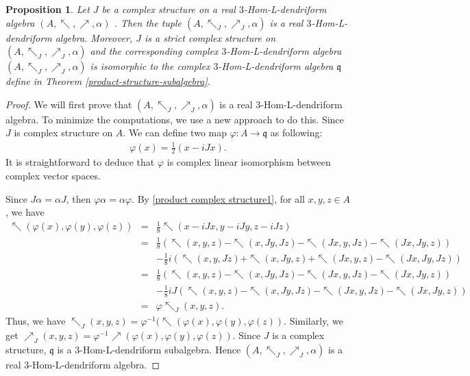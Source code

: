 \documentclass[a4paper,11pt]{article}
\def\a{\alpha}
\def\g{\gamma}
\def\nw{\nwarrow}
\def\ne{\nearrow}
\newtheorem{pro}[thm]{Proposition}
\theoremstyle{definition}
\begin{document}
\begin{pro}\label{subalgebra-iso}
Let $J$ be a complex structure on a real $3$-Hom-L-dendriform algebra $(A,\nw,\ne,\alpha)$ . Then the tuple $(A,\nw_J,\ne_J,\alpha)$ is a real $3$-Hom-L-dendriform algebra. Moreover, $J$ is a strict complex structure on  $(A,\nw_J,\ne_J,\alpha)$ and the corresponding complex $3$-Hom-L-dendriform algebra $(A,\nw_J,\ne_J,\alpha)$  is isomorphic to the complex $3$-Hom-L-dendriform algebra $\mathfrak{q}$ define in Theorem \ref{product-structure-subalgebra}.
\end{pro}
\begin{proof}
We will first prove that   $(A,\nw_J,\ne_J,\alpha)$ is a real $3$-Hom-L-dendriform algebra. To minimize the computations, we use a new approach to do this.
Since $J$ is  complex structure on $A$. We can define  two map $\varphi:A\to\mathfrak{q}$  as following:
\begin{eqnarray*}
\varphi(x)=\frac{1}{2}(x-iJx).
\end{eqnarray*}
It is straightforward to deduce that $\varphi$ is complex linear isomorphism between complex vector spaces.
%

  Since $J\a=\a J $, then $\varphi\a=\a \varphi $. By \eqref{product complex structure1}, for all $x,y,z\in A$, we have
\begin{eqnarray}
\nonumber\nw(\varphi(x),\varphi(y),\varphi(z))&=&\frac{1}{8}\nw(x-iJx,y-iJy,z-iJz)\\
                                                  \nonumber &=&\frac{1}{8}(\nw(x,y,z)-\nw(x,Jy,Jz)-\nw(Jx,y,Jz)-\nw(Jx,Jy,z))\\
                                                   \nonumber&&-\frac{1}{8}i(\nw(x,y,Jz)+\nw(x,Jy,z)+\nw(Jx,y,z)-\nw(Jx,Jy,Jz))\\
                                                  \nonumber &=&\frac{1}{8}(\nw(x,y,z)-\nw(x,Jy,Jz)-\nw(Jx,y,Jz)-\nw(Jx,Jy,z))\\
                                                  \nonumber &&-\frac{1}{8}iJ(\nw(x,y,z)-\nw(x,Jy,Jz)-\nw(Jx,y,Jz)-\nw(Jx,Jy,z))\\
                                                   \label{eq:Jiso}&=&\varphi\nw_J(x,y,z).
\end{eqnarray}
Thus, we have $\nw_J(x,y,z)=\varphi^{-1}(\nw(\varphi(x),\varphi(y),\varphi(z))$. Similarly, we get $\ne_J(x,y,z)=\varphi^{-1}\ne(\varphi(x),\varphi(y),\varphi(z))$. Since $J $ is a complex structure, $\mathfrak{q}$ is a $3$-Hom-L-dendriform subalgebra. Hence $(A,\nw_J,\ne_J,\alpha)$ is a real $3$-Hom-L-dendriform algebra.


\end{proof}
\end{document}
